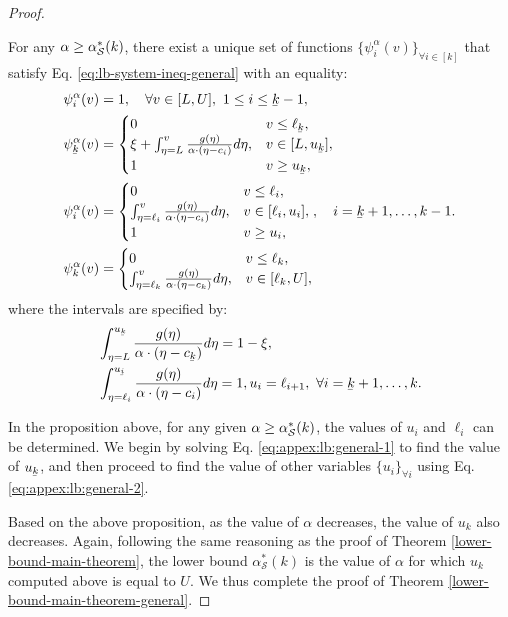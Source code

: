 \begin{proof}
\begin{proposition}\label{lemma-function-desing-lower-bound-cost-general}
For any $\alpha \geq \alpha_{\mathcal{S}}^*(k) $, there exist a unique set of functions ${\{\psi^{\alpha}_{i}(v)\}}_{\forall i \in [k]}$ that satisfy Eq. \eqref{eq:lb-system-ineq-general} with an equality:
     \begin{align*}
         &\psi^{\alpha}_{i}(v) = 1, \quad \forall v \in [L,U], \  1 \leq i \leq \ubar{k}-1, \\
         &\psi^{\alpha}_{\ubar{k}}(v) = \begin{cases}
         0 &  v \leq \ell_{\ubar{k}}, \\
         \xi + \int_{\eta=L}^{v} \frac{g(\eta)}{\alpha \cdot (\eta -c_{i})} d\eta, &  v \in [L,u_{\ubar{k}}], \\
         1 & v \ge u_{\ubar{k}},
         \end{cases}\\
         &\psi^{\alpha}_{i}(v) =\begin{cases}
         0 &  v \leq \ell_{i}, \\
          \int_{\eta=\ell_{i}}^{v} \frac{g(\eta)}{\alpha \cdot (\eta -c_{i})} d\eta, &  v \in [\ell_{i},u_{i}], \\
         1 & v \ge u_{i},
         \end{cases} ,\quad  i = \ubar{k}+1, \dots ,k-1. \\
         &\psi^{\alpha}_{k}(v) =\begin{cases}
         0 &  v \leq \ell_{k}, \\
          \int_{\eta=\ell_{k}}^{v} \frac{g(\eta)}{\alpha \cdot (\eta -c_{k})} d\eta, &  v \in [\ell_{k},U],
         \end{cases}
     \end{align*}
 where the intervals are specified by:
 \begin{align}
 \label{eq:appex:lb:general-1}
     &  \int_{\eta = L}^{u_{\ubar{k}}} \frac{g(\eta)}{\alpha \cdot (\eta-c_{\ubar{k}})} d\eta = 1 - \xi, \\
     \label{eq:appex:lb:general-2}
     & \int_{\eta = \ell_{i}}^{u_{\ubar{i}}} \frac{g(\eta)}{\alpha \cdot (\eta-c_{i})}  d\eta = 1, u_{i} = \ell_{i+1}, \ \forall i = \ubar{k}+1, \dots ,k.
 \end{align}
 \end{proposition} 
 
In the proposition above, for any given $\alpha \geq \alpha_{\mathcal{S}}^*(k) $, the values of $u_{i}$ and $\ell_{i}$ can be determined. We begin by solving Eq. \eqref{eq:appex:lb:general-1} to find the value of $u_{\ubar{k}}$, and then proceed to find the value of other variables $ \{u_{i}\}_{\forall i}$ using Eq. \eqref{eq:appex:lb:general-2}.

 
 Based on the above proposition, as the value of $\alpha$ decreases, the value of $u_{k}$ also decreases. Again, following the same reasoning as the proof of Theorem \ref{lower-bound-main-theorem}, the lower bound $\alpha_{\mathcal{S}}^*(k)$ is the value of $\alpha$ for which $u_{k}$ computed above is equal to $U$. We thus complete the proof of Theorem \ref{lower-bound-main-theorem-general}. 
\end{proof}


